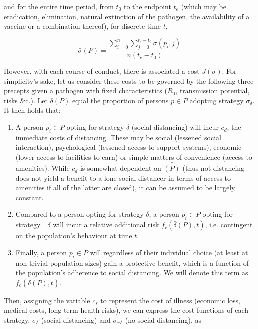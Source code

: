 \documentclass{article}
\begin{document}
\noindent and for the entire time period, from $t_0$ to the endpoint $t_e$ (which may be eradication, elimination, natural extinction of the pathogen, the availability of a vaccine or a combination thereof), for discrete time $t$,

\begin{equation}
	\bar{\bar{\sigma}}(P) = \frac{\displaystyle \sum_{i = 0}^n \displaystyle \sum_{j = 0}^{t_e - t_0} \sigma(p_i, j)}{n (t_e - t_0)}
	\label{eq:overall_strategy_over_time}
\end{equation}

However, with each course of conduct, there is associated a cost $J(\sigma)$. For simplicity's sake, let us consider these costs to be governed by the following three precepts given a pathogen with fixed characteristics ($R_0$, transmission potential, risks \&c.). Let $\bar{\delta}(P)$ equal the proportion of persons $p \in P$ adopting strategy $\sigma_{\delta}$. It then holds that: 

\begin{enumerate}
	\item A person $p_i \in P$ opting for strategy $\delta$ (social distancing) will incur $c_d$, the immediate costs of distancing. These may be social (lessened social interaction), psychological (lessened access to support systems), economic (lower access to facilities to earn) or simple matters of convenience (access to amenities). While $c_d$ is somewhat dependent on $\bar{\bar{(P)}}$ (thus not distancing does not yield a benefit to a lone social distancer in terms of access to amenities if all of the latter are closed), it can be assumed to be largely constant.
	\item Compared to a person opting for strategy $\delta$, a person $p_i \in P$ opting for strategy $\lnot \delta$ will incur a relative additional risk $f_r(\bar{\delta}(P), t)$, i.e. contingent on the population's behaviour at time $t$.
	\item Finally, a person $p_i \in P$ will regardless of their individual choice (at least at non-trivial population sizes) gain a protective benefit, which is a function of the population's adherence to social distancing. We will denote this term as $f_c(\bar{\delta}(P), t)$.
\end{enumerate}

Then, assigning the variable $c_s$ to represent the cost of illness (economic loss, medical costs, long-term health risks), we can express the cost functions of each strategy, $\sigma_{\delta}$ (social distancing) and $\sigma_{\lnot \delta}$ (no social distancing), as
\end{document}
